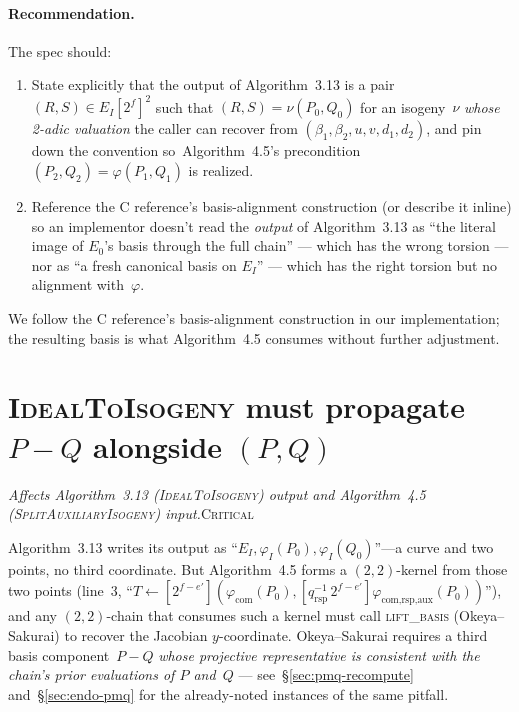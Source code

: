 \documentclass[a4paper,11pt]{article}
\newcommand{\algo}[1]{Algorithm~#1}
\newcommand{\critical}{\textsc{\color{BrickRed}Critical}}
\newcommand{\finding}[2]{\noindent\textit{#1}\hfill#2\par\smallskip}
\begin{document}
\paragraph{Recommendation.}  The spec should:
\begin{enumerate}
  \item State explicitly that the output of \algo{3.13} is a
    pair $(R, S) \in E_I[2^f]^2$ such that $(R, S) = \nu(P_0, Q_0)$
    for an isogeny~$\nu$ \emph{whose 2-adic valuation} the caller
    can recover from $(\beta_1, \beta_2, u, v, d_1, d_2)$, and
    pin down the convention so~\algo{4.5}'s precondition
    $(P_2, Q_2) = \varphi(P_1, Q_1)$ is realized.
  \item Reference the C reference's basis-alignment construction
    (or describe it inline) so an implementor doesn't read the
    \emph{output} of \algo{3.13} as ``the literal image of $E_0$'s
    basis through the full chain'' --- which has the wrong
    torsion --- nor as ``a fresh canonical basis on $E_I$'' ---
    which has the right torsion but no alignment with~$\varphi$.
\end{enumerate}
We follow the C reference's basis-alignment construction in our
implementation; the resulting basis is what \algo{4.5} consumes
without further adjustment.

\section{\textsc{IdealToIsogeny} must propagate $P{-}Q$ alongside
  $(P, Q)$}
\label{sec:id2iso-pmq}

\finding{Affects \algo{3.13} (\textsc{IdealToIsogeny}) output and
  \algo{4.5} (\textsc{SplitAuxiliaryIsogeny}) input.}{\critical}

\algo{3.13} writes its output as ``$E_I, \varphi_I(P_0),
\varphi_I(Q_0)$''---a curve and two points, no third
coordinate.  But \algo{4.5} forms a $(2, 2)$-kernel from those
two points (line~3, ``$T \leftarrow [2^{f-e'}](\varphi_{\text{com}}(P_0),
[q_{\text{rsp}}^{-1}\,2^{f-e'}]\varphi_{\text{com,rsp,aux}}(P_0))$''),
and any $(2, 2)$-chain that consumes such a kernel must call
\textsc{lift\_basis} (Okeya--Sakurai) to recover the Jacobian
$y$-coordinate.  Okeya--Sakurai requires a third basis
component~$P{-}Q$ \emph{whose projective representative is
consistent with the chain's prior evaluations of $P$ and~$Q$} ---
see~\S\ref{sec:pmq-recompute} and~\S\ref{sec:endo-pmq} for the
already-noted instances of the same pitfall.
\end{document}
